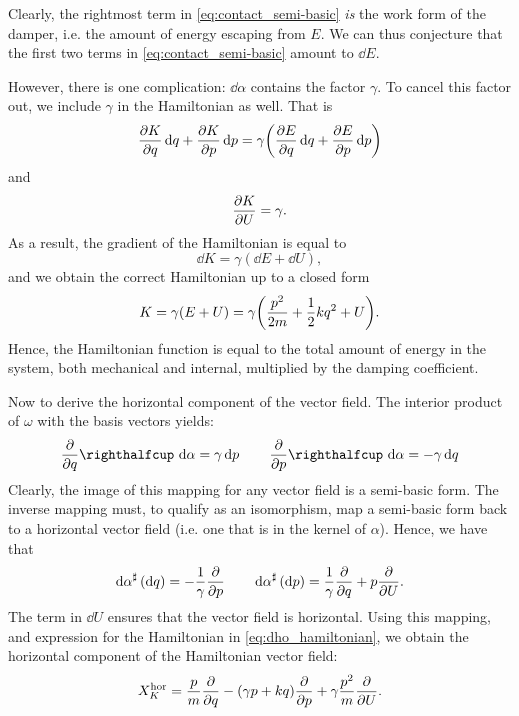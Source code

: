 Clearly, the rightmost term in \cref{eq:contact_semi-basic} \emph{is} the work form of the damper, i.e. the amount of energy escaping from \(E\). We can thus conjecture that the first two terms in \cref{eq:contact_semi-basic} amount to \(\dd{E}\).

However, there is one complication: \(\dd{\alpha}\) contains the factor \(\gamma\). To cancel this factor out, we include \(\gamma\) in the Hamiltonian as well. That is
\begin{equation}
     \pdv{K}{q}\dd{q} + \pdv{K}{p}\dd{p} = \gamma \qty(\pdv{E}{q}\dd{q} + \pdv{E}{p}\dd{p})
\end{equation}
and 
\begin{equation}
     \pdv{K}{U} = \gamma.
\end{equation}
As a result, the gradient of the Hamiltonian is equal to 
\begin{equation}
     \dd{K} = \gamma (\dd{E} + \dd{U}),
\end{equation}
and we obtain the correct Hamiltonian up to a closed form
\begin{equation} 
    K = \gamma (E + U) = \gamma\qty( \frac{p^2}{2m} + \frac{1}{2}kq^2 + U). 
    \label{eq:dho_hamiltonian}
\end{equation} 
Hence, the Hamiltonian function is equal to the total amount of energy in the system, both mechanical and internal, multiplied by the damping coefficient.

Now to derive the horizontal component of the vector field. The interior product of \(\omega\) with the basis vectors yields:
\begin{equation}
    \intpr{\pdv{}{q}}{\dd{\alpha}} = \gamma \dd{p} \qquad \intpr{\pdv{}{p}}{\dd{\alpha}} = -\gamma \dd{q}
\end{equation}
Clearly, the image of this mapping for any vector field is a semi-basic form. The inverse mapping must, to qualify as an isomorphism, map a semi-basic form back to a horizontal vector field (i.e. one that is in the kernel of \(\alpha\)). Hence, we have that
\begin{equation} 
    \dd{\alpha}^\sharp\qty(\dd{q}) = -\frac{1}{\gamma} \pdv{}{p} \qquad 
    \dd{\alpha}^\sharp\qty(\dd{p}) = \frac{1}{\gamma}\pdv{}{q} +  p \pdv{}{U}. 
\end{equation}
The term in \(\dd{U}\) ensures that the vector field is horizontal. Using this mapping, and expression for the Hamiltonian in \cref{eq:dho_hamiltonian}, we obtain the horizontal component of the Hamiltonian vector field:
\begin{equation} 
    X_K^\text{hor} = \frac{p}{m}\pdv{}{q} - (\gamma p + kq)\pdv{}{p} + \gamma \frac{p^2}{m} \pdv{}{U}.
    \label{eq:dho_horizontal}
\end{equation}

